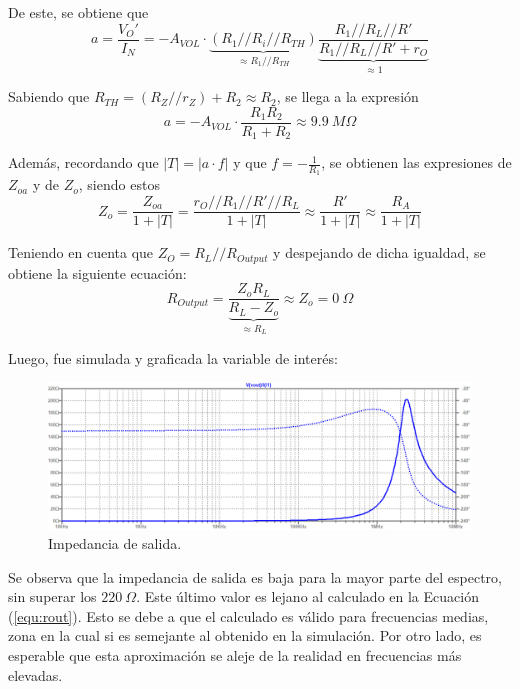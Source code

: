 De este, se obtiene que
\begin{equation*}
	a = \frac{V_O'}{I_N} = - A_{VOL} \cdot \underbrace{\left( R_1 // R_i // R_{TH} \right)}_{\approx R_1 // R_{TH}} \underbrace{\frac{R_1 // R_L // R'}{R_1 // R_L // R' + r_O}}_{\approx 1}
\end{equation*}

Sabiendo que $R_{TH} = \left( R_Z // r_Z \right) + R_2 \approx R_2$, se llega a la expresión
\begin{equation}
	a = - A_{VOL} \cdot \frac{R_1 R_2}{R_1 + R_2} \approx 9.9 \ M \Omega
\end{equation}

Además, recordando que $|T| = |a \cdot f|$ y que $f = -\frac{1}{R_1}$, se obtienen las expresiones de $Z_{oa}$ y de $Z_o$, siendo estos
\begin{equation}
	Z_o = \frac{Z_{oa}}{1 + |T|} = \frac{r_O // R_1 // R' // R_L}{1 + |T|} \approx \frac{R'}{1 + |T|} \approx \frac{R_A}{1 + |T|}	
\end{equation}

Teniendo en cuenta que $Z_O = R_L // R_{Output}$ y despejando de dicha igualdad, se obtiene la siguiente ecuación:
\begin{equation}
	R_{Output} = \frac{Z_o R_L}{ \underbrace{R_L - Z_o}_{\approx R_L} } \approx Z_o = 0 \ \Omega
	\label{equ:rout}
\end{equation}

Luego, fue simulada y graficada la variable de interés:
\begin{figure}[H]
\centering
	\includegraphics[width=1\textwidth]{ImagenesEjercicio2/zoutspice.png}
	\caption{Impedancia de salida.}
	\label{fig:zout}
\end{figure}

Se observa que la impedancia de salida es baja para la mayor parte del espectro, sin superar los $220 \ \Omega$. Este último valor es lejano al calculado en la Ecuación (\ref{equ:rout}). Esto se debe a que el calculado es válido para frecuencias medias, zona en la cual si es semejante al obtenido en la simulación. Por otro lado, es esperable que esta aproximación se aleje de la realidad en frecuencias más elevadas.

